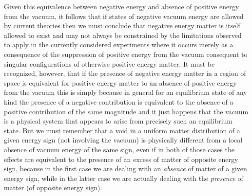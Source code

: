 \documentclass[notitlepage,12pt]{report}
\begin{document}
Given this equivalence between negative energy and absence of positive energy from the vacuum, it follows that if states of negative vacuum energy are allowed by current theories then we must conclude that negative energy matter is itself allowed to exist and may not always be constrained by the limitations observed to apply in the currently considered experiments where it occurs merely as a consequence of the suppression of positive energy from the vacuum consequent to singular configurations of otherwise positive energy matter. It must be recognized, however, that if the presence of negative energy matter in a region of space is equivalent for positive energy matter to an absence of positive energy from the vacuum this is simply because in general for an equilibrium state of any kind the presence of a negative contribution is equivalent to the absence of a positive contribution of the same magnitude and it just happens that the vacuum is a physical system that appears to arise from precisely such an equilibrium state. But we must remember that a void in a uniform matter distribution of a given energy sign (not involving the vacuum) is physically different from a local absence of vacuum energy of the same sign, even if in both of those cases the effects are equivalent to the presence of an excess of matter of opposite energy sign, because in the first case we are dealing with an \textit{absence} of matter of a given energy sign, while in the latter case we are actually dealing with the \textit{presence} of matter (of opposite energy sign).

\bigskip
\end{document}
